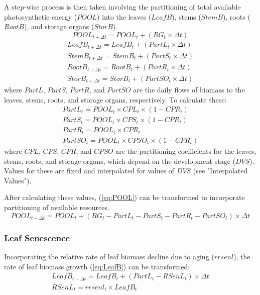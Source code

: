 A step-wise process is then taken involving the partitioning of total available photosynthetic energy ($POOL$) into the leaves ($LeafB$), stems ($StemB$), roots ($RootB$), and storage organs ($StorB$). 
\begin{equation}
\label{eq:POOL}
    POOL_{t+\Delta t}=POOL_t + (RG_t \times \Delta t)
\end{equation}
\begin{gather}
\label{eq:LeafB}
    LeafB_{t+\Delta t}=LeafB_t + (PartL_t \times \Delta t) \\
\label{eq:StemB}
    StemB_{t+\Delta t}=StemB_t + (PartS_t \times \Delta t) \\
    RootB_{t+\Delta t}=RootB_t + (PartR_t \times \Delta t) \\
\label{eq:StorB}
    StorB_{t+\Delta t}=StorB_t + (PartSO_t \times \Delta t)
\end{gather}
where $PartL$, $PartS$, $PartR$, and $PartSO$ are the daily flows of biomass to the leaves, stems, roots, and storage organs, respectively. To calculate these:
\begin{gather}
    PartL_t= POOL_t \times CPL_t \times (1-CPR_t) \\
    PartS_t= POOL_t \times CPS_t \times (1-CPR_t) \\
    PartR_t= POOL_t \times CPR_t \\
    PartSO_t= POOL_t \times CPSO_t \times (1-CPR_t)
\end{gather} 
where $CPL$, $CPS$, $CPR$, and $CPSO$ are the partitioning coefficients for the leaves, stems, roots, and storage organs, which depend on the development stage ($DVS$). Values for these are fixed and interpolated for values of $DVS$ (see "Interpolated Values").

After calculating these values, (\ref{eq:POOL}) can be transformed to incorporate partitioning of available resources.
\begin{equation}
    POOL_{t+\Delta t}=POOL_t + (RG_t - PartL_t - PartS_t - PartR_t - PartSO_t) \times \Delta t
\end{equation}
\subsubsection{Leaf Senescence}
Incorporating the relative rate of leaf biomass decline due to aging ($rrsenl$), the rate of leaf biomass growth (\ref{eq:LeafB}) can be transformed:
\begin{gather}
    LeafB_{t+\Delta t} = LeafB_t + (PartL_t - RSenL_t) \times \Delta t \\ 
    RSenL_t = rrsenl_t \times LeafB_t
\end{gather}
